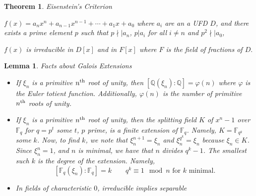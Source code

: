 \documentclass[12pt]{Qual}
\newtheorem{theorem}{Theorem}
\newtheorem{lemma}{Lemma}
\begin{document}
\vspace{0.5cm}
\begin{theorem}{\Large\textit{Eisenstein's Criterion}}

 \begin{minipage}{0.85\textwidth}
\vspace{1cm}
$f(x)=a_nx^n+a_{n-1}x^{n-1}+\cdots+a_1x+a_0$ where $a_i$ are an a UFD $D$, and there exists a prime element $p$ such that $p\nmid|a_n$, $p|a_i$ for all $i\not=n$ and $p^2\nmid|a_0$,
\end{minipage}

 \begin{minipage}{0.85\textwidth}
\vspace{0.45cm}
$f(x)$ is irreducible in $D[x]$ and in $F[x]$ where $F$ is the field of fractions of $D.$
\end{minipage}

\end{theorem}
\vspace{0.5cm}
\begin{lemma}{\Large\textit{Facts about Galois Extensions}}

\begin{itemize}
\renewcommand\labelitemi{\faCoffee}
    \item If $\xi_n$ is a primitive $n^\text{th}$ root of unity, then $[\mathbb{Q}(\xi_n):\mathbb{Q}]=\varphi(n)$ where $\varphi$ is the Euler totient function. Additionally, $\varphi(n)$ is the number of primitive $n^\text{th}$ roots of unity.
    \item If $\xi_n$ is a primitive $n^\text{th}$ root of unity, then the splitting field $K$ of $x^n-1$ over $\mathbb{F}_q$ for $q=p^t$ some $t$, $p$ prime, is a finite extension of $\mathbb{F}_q$. Namely, $K=\mathbb{F}_{q^k}$ some $k$. Now, to find $k$, we note that $\xi_n^{n+1}=\xi_n$ and $\xi_n^{q^k}=\xi_n$ because $\xi_n\in K$. Since $\xi_n^n=1$, and $n$ is minimal, we have that $n$ divides $q^k-1$. The smallest such $k$ is the degree of the extension. Namely, $$[\mathbb{F}_q(\xi_n):\mathbb{F}_q]=k\qquad q^k\equiv 1\mod n\text{ for }k\text{ minimal}.$$
    \item In fields of characteristic $0$, irreducible implies separable
\end{itemize}

\end{lemma}
\vspace{0.5cm}
\end{document}
